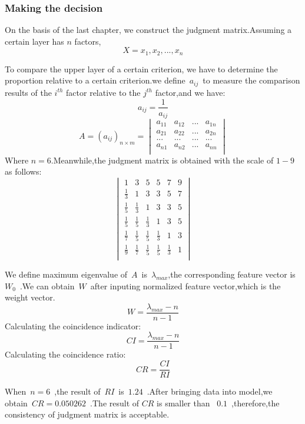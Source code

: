 \documentclass{mcmthesis}
\begin{document}
\subsubsection{Making the decision}
\par On the basis of the last chapter, we construct the judgment matrix.Assuming a certain layer has $n$ factors,
\begin{equation}
X={{x}_{1},{x}_{2},...,{x}_{n}}
\end{equation}
\par To compare the upper layer of a certain criterion, we have to determine the proportion relative to a certain criterion.we define~${a}_{ij} $~to measure the comparison results of the ${i}^{th}$ factor relative to the ${j}^{th}$ factor,and we have:
\begin{equation}
{a}_{ij}=\frac{1}{{a}_{ij}}
\end{equation}
\begin{equation}
A={({a}_{ij})}_{n\times m}=
\begin{vmatrix}
{a}_{11} & {a}_{12} &... &{a}_{1n} \\ 
 {a}_{21}&{a}_{22}& ... &{a}_{2n} \\ 
 ...&...  & ... &... \\ 
 {a}_{n1}& {a}_{n2}&...&{a}_{nn} \\
\end{vmatrix}
\end{equation}
Where $n=6$.Meanwhile,the judgment matrix is obtained with the scale of $1-9$ as follows:
\begin{equation}
\begin{vmatrix}
 1& 3 &5  &5  &7  &9 \\ 
 \frac{1}{3}& 1 & 3 & 3 &5  &7 \\ 
 \frac{1}{5}&   \frac{1}{3}&  1&  3&  3&5 \\ 
 \frac{1}{5}&  \frac{1}{5} & \frac{1}{3}  &1  &  3&5 \\ 
 \frac{1}{7}&  \frac{1}{5} &   \frac{1}{5}&  \frac{1}{3} &  1& 3\\ 
 \frac{1}{9}&  \frac{1}{7} &  \frac{1}{5} &  \frac{1}{5} &  \frac{1}{3} & 1\\
\end{vmatrix}
\end{equation}
\par We define maximum eigenvalue of~$A$~is~${\lambda }_{max}$,the corresponding feature vector is~${W}_{0}$~.We can obtain~$W$~after inputing normalized feature vector,which is the weight vector.
\begin{equation}
W=\frac{{\lambda }_{max}-n}{n-1}
\end{equation}
Calculating the coincidence indicator:
\begin{equation}
CI=\frac{{\lambda }_{max}-n}{n-1}
\end{equation}
Calculating the coincidence ratio:
\begin{equation}
CR=\frac{CI}{RI}
\end{equation}
\par When~$n=6$~,the result of~$RI$~is~$1.24$~.After bringing data into model,we obtain~$CR=0.050262$~.The result of $CR$ is smaller than ~$0.1$~,therefore,the consistency of judgment matrix is acceptable.
\end{document}
